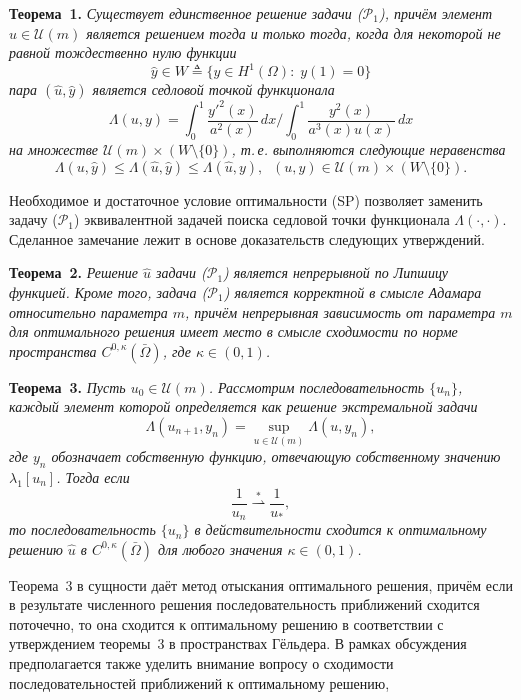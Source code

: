 \textbf{Теорема~1.} {\it Существует единственное решение задачи \emph{($\mathcal{P}_1$)},
причём элемент $\hat{u} \in \mathcal{U}(m)$ является решением тогда и только тогда,
когда
для некоторой не равной тождественно нулю функции
\[
\hat{y} \in W \triangleq \{ y \in H^1(\Omega) : \; y(1) = 0 \}
\]
пара $(\hat{u}, \hat{y})$ является седловой точкой функционала
\[
\Lambda(u, y) = \int_0^1 \frac{y'^2(x)}{a^2(x)} \, dx \Bigg/
\int_0^1 \frac{y^2(x)}{a^3(x) u(x)} \, dx
\]
на множестве
$\mathcal{U}(m) \times \left(W \setminus \{ 0 \}\right)$,
т.\,е.
выполняются следующие неравенства}
\[
\Lambda(u, \hat{y})
\leq
\Lambda(\hat{u}, \hat{y})
\leq
\Lambda(\hat{u}, y),
\;\;
(u, y) \in \mathcal{U}(m) \times \left(W \setminus \{ 0 \}\right).
\tag{SP}
\]
%
%
%
\par
Необходимое и достаточное условие оптимальности (SP) позволяет заменить задачу ($\mathcal{P}_1$)
эквивалентной задачей поиска седловой точки функционала $\Lambda(\cdot, \cdot)$.
%
%
%
Сделанное замечание лежит в основе доказательств следующих утверждений.
%
%
%
\par
\textbf{Теорема~2.} {\it Решение $\hat{u}$ задачи \emph{($\mathcal{P}_1$)}
является непрерывной по Липшицу функцией.
%
%
%
Кроме того,
задача \emph{($\mathcal{P}_1$)} является корректной в смысле Адамара относительно параметра
$m$,
причём непрерывная зависимость от параметра $m$ для оптимального решения имеет место в смысле сходимости по норме пространства $C^{0,\kappa}(\bar{\Omega})$,
где $\kappa \in (0, 1)$.
}
%
%
%
\par
\textbf{Теорема~3.} {\it Пусть $u_0 \in \mathcal{U}(m)$.
%
%
%
Рассмотрим последовательность $\{ u_n \}$, каждый элемент которой определяется как решение
экстремальной задачи
\[
\Lambda(u_{n + 1}, y_n) = \sup_{u \in \mathcal{U}(m)} \Lambda(u, y_n),
\]
где
$y_n$ обозначает собственную функцию, отвечающую собственному значению $\lambda_1[u_n]$.
%
%
%
Тогда если
\[
\frac{1}{u_n}
\overset{*}{\rightharpoonup} \frac{1}{u_*},
\]
то последовательность $\{ u_n \}$ в действительности сходится
к оптимальному решению $\hat{u}$ в $C^{0,\kappa}(\bar{\Omega})$
для любого значения $\kappa \in (0, 1)$.
}
%
%
%
\par
Теорема~3 в сущности даёт метод отыскания оптимального решения,
причём если в результате численного решения последовательность приближений
сходится поточечно,
то она сходится к оптимальному решению в соответствии
с утверждением теоремы~3 в пространствах Гёльдера.
%
%
%
В рамках обсуждения предполагается также
уделить внимание вопросу о сходимости последовательностей приближений к оптимальному решению,
